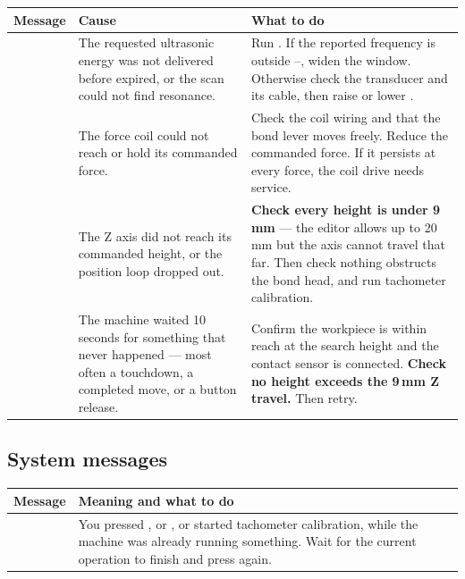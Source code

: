 \begin{center}\small
\begin{tabular}{@{}L{40mm}L{40mm}L{45mm}@{}}
\toprule
\textbf{Message} & \textbf{Cause} & \textbf{What to do} \\
\midrule

 &
The requested ultrasonic energy was not delivered before 
expired, or the scan could not find resonance. &
Run . If the reported frequency is outside
--, widen the window. Otherwise check
the transducer and its cable, then raise  or lower
. \\
\addlinespace

 &
The force coil could not reach or hold its commanded force. &
Check the coil wiring and that the bond lever moves freely. Reduce the
commanded force. If it persists at every force, the coil drive needs service. \\
\addlinespace

 &
The Z axis did not reach its commanded height, or the position loop dropped
out. &
\textbf{Check every height is under 9\,mm} --- the editor allows up to 20\,mm
but the axis cannot travel that far. Then check nothing obstructs the bond
head, and run tachometer calibration. \\
\addlinespace

 &
The machine waited 10 seconds for something that never happened --- most often
a touchdown, a completed move, or a button release. &
Confirm the workpiece is within reach at the search height and the contact
sensor is connected. \textbf{Check no height exceeds the 9\,mm Z travel.} Then
retry. \\

\bottomrule
\end{tabular}
\end{center}


\subsection*{System messages}

\begin{center}\small
\begin{tabular}{@{}L{40mm}L{85mm}@{}}
\toprule
\textbf{Message} & \textbf{Meaning and what to do} \\
\midrule
{} &
You pressed ,  or , or started
tachometer calibration, while the machine was already running something. Wait
for the current operation to finish and press again. \\
\bottomrule
\end{tabular}
\end{center}

